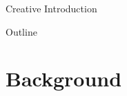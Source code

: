 
\begin{frame}[c]{Creative Introduction}

\end{frame}

\begin{frame}{Outline}
    \tableofcontents
\end{frame}

\section{Background}